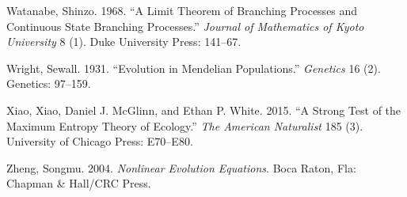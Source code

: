 \documentclass[]{article}
\begin{document}
\leavevmode\hypertarget{ref-Watanabe1968}{}%
Watanabe, Shinzo. 1968. ``A Limit Theorem of Branching Processes and
Continuous State Branching Processes.'' \emph{Journal of Mathematics of
Kyoto University} 8 (1). Duke University Press: 141--67.

\leavevmode\hypertarget{ref-Wright97}{}%
Wright, Sewall. 1931. ``Evolution in Mendelian Populations.''
\emph{Genetics} 16 (2). Genetics: 97--159.

\leavevmode\hypertarget{ref-Xiao2015}{}%
Xiao, Xiao, Daniel J. McGlinn, and Ethan P. White. 2015. ``A Strong Test
of the Maximum Entropy Theory of Ecology.'' \emph{The American
Naturalist} 185 (3). University of Chicago Press: E70--E80.

\leavevmode\hypertarget{ref-zheng2004nonlinear}{}%
Zheng, Songmu. 2004. \emph{Nonlinear Evolution Equations}. Boca Raton,
Fla: Chapman \& Hall/CRC Press.
\end{document}
